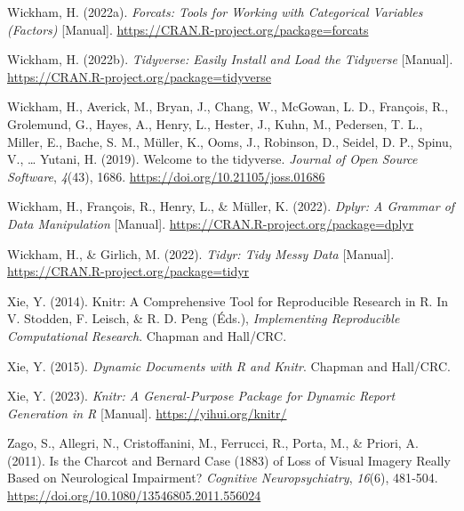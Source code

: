\documentclass[
  12pt,
]{article}
\newlength{\cslhangindent}
\newlength{\cslentryspacingunit} %
\newenvironment{CSLReferences}[2] %
 {%
  \setlength{\parindent}{0pt}
  \ifodd #1
  \let\oldpar\par
  \def\par{\hangindent=\cslhangindent\oldpar}
  \fi
  \setlength{\parskip}{#2\cslentryspacingunit}
 }%
 {}
\begin{document}
\begin{CSLReferences}{1}{0}
\leavevmode{}%
Wickham, H. (2022a). \emph{Forcats: {Tools} for Working with Categorical
Variables (Factors)} {[}Manual{]}.
\url{https://CRAN.R-project.org/package=forcats}

\leavevmode{}%
Wickham, H. (2022b). \emph{Tidyverse: {Easily} Install and Load the
Tidyverse} {[}Manual{]}.
\url{https://CRAN.R-project.org/package=tidyverse}

\leavevmode{}%
Wickham, H., Averick, M., Bryan, J., Chang, W., McGowan, L. D.,
François, R., Grolemund, G., Hayes, A., Henry, L., Hester, J., Kuhn, M.,
Pedersen, T. L., Miller, E., Bache, S. M., Müller, K., Ooms, J.,
Robinson, D., Seidel, D. P., Spinu, V., \ldots{} Yutani, H. (2019).
Welcome to the {tidyverse}. \emph{Journal of Open Source Software},
\emph{4}(43), 1686. \url{https://doi.org/10.21105/joss.01686}

\leavevmode{}%
Wickham, H., François, R., Henry, L., \& Müller, K. (2022). \emph{Dplyr:
{A} Grammar of Data Manipulation} {[}Manual{]}.
\url{https://CRAN.R-project.org/package=dplyr}

\leavevmode{}%
Wickham, H., \& Girlich, M. (2022). \emph{Tidyr: {Tidy} Messy Data}
{[}Manual{]}. \url{https://CRAN.R-project.org/package=tidyr}

\leavevmode{}%
Xie, Y. (2014). Knitr: {A} Comprehensive Tool for Reproducible Research
in {R}. In V. Stodden, F. Leisch, \& R. D. Peng (Éds.),
\emph{Implementing Reproducible Computational Research}. {Chapman and
Hall/CRC}.

\leavevmode{}%
Xie, Y. (2015). \emph{Dynamic Documents with {R} and Knitr}. {Chapman
and Hall/CRC}.

\leavevmode{}%
Xie, Y. (2023). \emph{Knitr: {A} General-Purpose Package for Dynamic
Report Generation in {R}} {[}Manual{]}. \url{https://yihui.org/knitr/}

\leavevmode{}%
Zago, S., Allegri, N., Cristoffanini, M., Ferrucci, R., Porta, M., \&
Priori, A. (2011). Is the {Charcot} and {Bernard} Case (1883) of Loss of
Visual Imagery Really Based on Neurological Impairment? \emph{Cognitive
Neuropsychiatry}, \emph{16}(6), 481‑504.
\url{https://doi.org/10.1080/13546805.2011.556024}


\end{CSLReferences}
\end{document}
